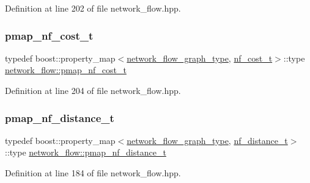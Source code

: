 Definition at line 202 of file network\+\_\+flow.\+hpp.

\mbox{\label{classnetwork__flow_ab3d76d6bf04d076c74f5f51cc55f621e}} 
\subsubsection{\texorpdfstring{pmap\+\_\+nf\+\_\+cost\+\_\+t}{pmap\_nf\_cost\_t}}
{\footnotesize\ttfamily typedef boost\+::property\+\_\+map$<$\hyperlink{classnetwork__flow_abfdb8d1baba183c2b121f8c078b9b640}{network\+\_\+flow\+\_\+graph\+\_\+type}, \hyperlink{structnetwork__flow_1_1nf__cost__t}{nf\+\_\+cost\+\_\+t}$>$\+::type \hyperlink{classnetwork__flow_ab3d76d6bf04d076c74f5f51cc55f621e}{network\+\_\+flow\+::pmap\+\_\+nf\+\_\+cost\+\_\+t}\hspace{0.3cm}{\ttfamily [private]}}



Definition at line 204 of file network\+\_\+flow.\+hpp.

\mbox{\label{classnetwork__flow_a2341f0fc871494e5fa44bc4fe5967a0e}} 
\subsubsection{\texorpdfstring{pmap\+\_\+nf\+\_\+distance\+\_\+t}{pmap\_nf\_distance\_t}}
{\footnotesize\ttfamily typedef boost\+::property\+\_\+map$<$\hyperlink{classnetwork__flow_abfdb8d1baba183c2b121f8c078b9b640}{network\+\_\+flow\+\_\+graph\+\_\+type}, \hyperlink{structnetwork__flow_1_1nf__distance__t}{nf\+\_\+distance\+\_\+t}$>$\+::type \hyperlink{classnetwork__flow_a2341f0fc871494e5fa44bc4fe5967a0e}{network\+\_\+flow\+::pmap\+\_\+nf\+\_\+distance\+\_\+t}\hspace{0.3cm}{\ttfamily [private]}}



Definition at line 184 of file network\+\_\+flow.\+hpp.

\mbox{\label{classnetwork__flow_a1ea6b2ccbcafb4ecd4d6fb0e64b53350}} 
